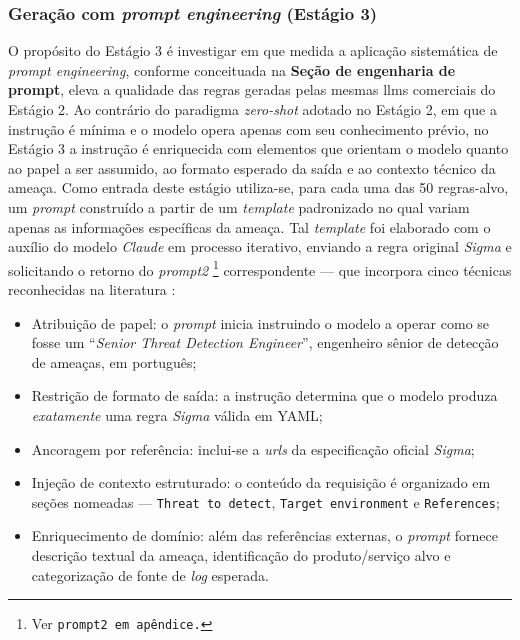 \subsubsection{Geração com \textit{prompt engineering} (Estágio 3)}

O propósito do Estágio 3 é investigar em que medida a aplicação sistemática de \textit{prompt engineering}, conforme conceituada na \textbf{Seção de engenharia de prompt}, eleva a qualidade das regras geradas pelas mesmas \gls{llm}s comerciais do Estágio 2. 
Ao contrário do paradigma \textit{zero-shot} adotado no Estágio 2, em que a instrução é mínima e o modelo opera apenas com seu conhecimento prévio, no Estágio 3 a instrução é enriquecida com elementos que orientam o modelo quanto ao papel a ser assumido, ao formato esperado da saída e ao contexto técnico da ameaça.
Como entrada deste estágio utiliza-se, para cada uma das 50 regras-alvo, um \textit{prompt} construído a partir de um \textit{template} padronizado no qual variam apenas as informações específicas da ameaça. 
Tal \textit{template} foi elaborado com o auxílio do modelo \textit{Claude} em processo iterativo, enviando a regra original \textit{Sigma} e solicitando o retorno do \textit{prompt2}
\footnote{Ver \texttt{prompt2 em apêndice.}}
correspondente --- que incorpora cinco técnicas reconhecidas na literatura \cite{liu2023pretrain}:
\begin{itemize}
	\item Atribuição de papel: o \textit{prompt} inicia instruindo o modelo a operar como se fosse um ``\textit{Senior Threat Detection Engineer}'', engenheiro sênior de detecção de ameaças, em português;
	\item Restrição de formato de saída: a instrução determina que o modelo produza \textit{exatamente} uma regra \textit{Sigma} válida em YAML;
	\item Ancoragem por referência: inclui-se a \textit{\gls{url}s} da especificação oficial \textit{Sigma};
	\item Injeção de contexto estruturado: o conteúdo da requisição é organizado em seções nomeadas --- \texttt{Threat to detect}, \texttt{Target environment} e \texttt{References};
	\item Enriquecimento de domínio: além das referências externas, o \textit{prompt} fornece descrição textual da ameaça, identificação do produto/serviço alvo e categorização de fonte de \textit{log} esperada.
\end{itemize}

